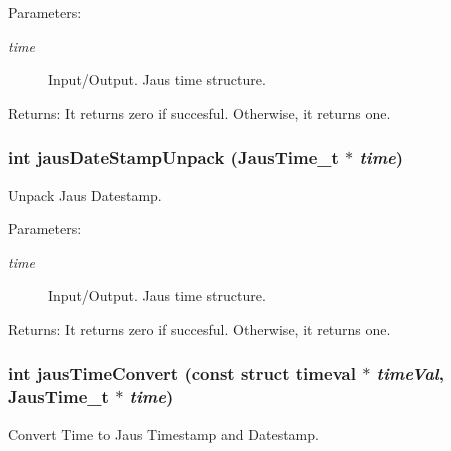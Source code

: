 \begin{Desc}
\item[Parameters:]
\begin{description}
\item[{\em time}]Input/Output. Jaus time structure.\end{description}
\end{Desc}
\begin{Desc}
\item[Returns:]It returns zero if succesful. Otherwise, it returns one. \end{Desc}
\hypertarget{group__time__conv_ga8c0786a64ecb030207a9153aa8cd624}{
\subsubsection[jausDateStampUnpack]{\setlength{\rightskip}{0pt plus 5cm}int jausDateStampUnpack ({\bf JausTime\_\-t} $\ast$ {\em time})}}
\label{group__time__conv_ga8c0786a64ecb030207a9153aa8cd624}


Unpack Jaus Datestamp. 

\begin{Desc}
\item[Parameters:]
\begin{description}
\item[{\em time}]Input/Output. Jaus time structure.\end{description}
\end{Desc}
\begin{Desc}
\item[Returns:]It returns zero if succesful. Otherwise, it returns one. \end{Desc}
\hypertarget{group__time__conv_gfabd8046b6f8c5c8c8ba591a283ce5cf}{
\subsubsection[jausTimeConvert]{\setlength{\rightskip}{0pt plus 5cm}int jausTimeConvert (const struct timeval $\ast$ {\em timeVal}, \/  {\bf JausTime\_\-t} $\ast$ {\em time})}}
\label{group__time__conv_gfabd8046b6f8c5c8c8ba591a283ce5cf}


Convert Time to Jaus Timestamp and Datestamp. 

